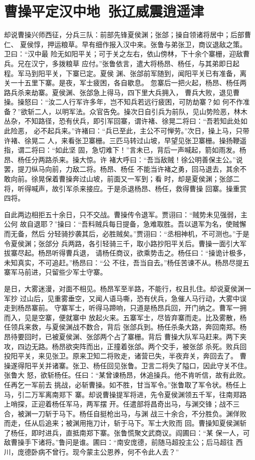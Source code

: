 \chapter{曹操平定汉中地~张辽威震逍遥津}

却说曹操兴师西征，分兵三队：前部先锋夏侯渊；张郃；操自领诸将居中；后部曹仁、
夏侯惇，押运粮草。早有细作报入汉中来。张鲁与弟张卫，商议退敌之策。卫曰：“汉中最
险无如阳平关；可于关之左右，依山傍林，下十余个寨栅，迎敌曹兵。兄在汉宁，多拨粮草
应付。”张鲁依言，遣大将杨昂、杨任，与其弟即日起程。军马到阳平关，下寨已定。夏侯
渊、张郃前军随到，闻阳平关已有准备，离关一十五里下寨。是夜，军士疲困，各自歇息。
忽寨后一把火起，杨昂、杨任两路兵杀来劫寨。夏侯渊、张郃急上得马，四下里大兵拥入，
曹兵大败，退见曹操。操怒曰：“汝二人行军许多年，岂不知兵若远行疲困，可防劫寨？如
何不作准备？”欲斩二人，以明军法。众官告免。操次日自引兵为前队，见山势险恶，林木
丛杂，不知路径，恐有伏兵，即引军回寨，谓许褚、徐晃二将曰：“吾若知此处如此险恶，
必不起兵来。”许褚曰：“兵已至此，主公不可惮劳。”次日，操上马，只带许褚、徐晃二
人，来看张卫寨栅。三匹马转过山坡，早望见张卫寨栅。操扬鞭遥指，谓二将曰：“如此坚
固，急切难下！”言未已，背后一声喊起，箭如雨发。杨昂、杨任分两路杀来。操大惊。许
褚大呼曰：“吾当敌贼！徐公明善保主公。”说罢，提刀纵马向前，力敌二将。杨昂、杨任
不能当许褚之勇，回马退去，其余不敢向前。徐晃保着曹操奔过山坡，前面又一军到；看
时，却是夏侯渊；张郃二将，听得喊声，故引军杀来接应。于是杀退杨昂、杨任，救得曹操
回寨。操重赏四将。

自此两边相拒五十余日，只不交战。曹操传令退军。贾诩曰：“贼势未见强弱，主公何
故自退耶？”操曰：“吾料贼兵每日提备，急难取胜。吾以退军为名，使贼懈而无备，然后
分轻骑抄袭其后，必胜贼矣。”贾诩曰：“丞相神机，不可测也。”于是令夏侯渊；张郃分
兵两路，各引轻骑三千，取小路抄阳平关后。曹操一面引大军拔寨尽起。杨昂听得曹兵退，
请杨任商议，欲乘势击之。杨任曰：“操诡计极多，未知真实，不可追赶。”杨昂曰：“公
不往，吾当自去。”杨任苦谏不从。杨昂尽提五寨军马前进，只留些少军士守寨。

是日，大雾迷漫，对面不相见。杨昂军至半路，不能行，权且扎住。却说夏侯渊一军抄
过山后，见重雾垂空，又闻人语马嘶，恐有伏兵，急催人马行动，大雾中误走到杨昂寨前。
守寨军士，听得马蹄响，只道是杨昂兵回，开门纳之。曹军一拥而入，见是空寨，便就寨中
放起火来。五寨军士，尽皆弃寨而走。比及雾散，杨任领兵来救，与夏侯渊战不数合，背后
张郃兵到。杨任杀条大路，奔回南郑。杨昂待要回时，已被夏侯渊、张郃两个占了寨栅。背后
曹操大队军马赶来。两下夹攻，四边无路。杨昂欲突阵而出，正撞着张郃。两个交手，被张郃
杀死。败兵回投阳平关，来见张卫。原来卫知二将败走，诸营已失，半夜弃关，奔回去了。
曹操遂得阳平关并诸寨。张卫、杨任回见张鲁。卫言二将失了隘口，因此守关不住。张鲁大
怒，欲斩杨任。任曰：“某曾谏杨昂，休追操兵。他不肯听信，故有此败。任再乞一军前去
挑战，必斩曹操。如不胜，甘当军令。”张鲁取了军令状。杨任上马，引二万军离南郑下
寨。却说曹操提军将进，先令夏侯渊领五千军，往南郑路上哨探，正迎着杨任军马，两军摆
开。任遣部将昌奇出马，与渊交锋；战不三合，被渊一刀斩于马下。杨任自挺枪出马，与渊
战三十余合，不分胜负。渊佯败而走，任从后追来；被渊用拖刀计，斩于马下。军士大败而
回。曹操知夏侯渊斩了杨任，即时进兵，直抵南郑下寨。张鲁慌聚文武商议。阎圃曰：“某
保一人，可敌曹操手下诸将。”鲁问是谁。圃曰：“南安庞德，前随马超投主公；后马超往
西川，庞德卧病不曾行。现今蒙主公恩养，何不令此人去？”

